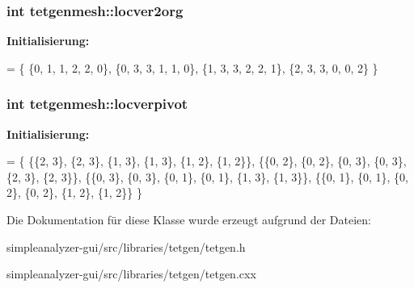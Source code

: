 \hypertarget{classtetgenmesh_a499b15cecc1ec34f5344c76374e76039}{
\subsubsection[{locver2org}]{\setlength{\rightskip}{0pt plus 5cm}int tetgenmesh\-::locver2org\hspace{0.3cm}{\ttfamily [static]}}}\label{classtetgenmesh_a499b15cecc1ec34f5344c76374e76039}
{\bfseries Initialisierung\-:}
\begin{DoxyCode}
= \{
  \{0, 1, 1, 2, 2, 0\},
  \{0, 3, 3, 1, 1, 0\},
  \{1, 3, 3, 2, 2, 1\},
  \{2, 3, 3, 0, 0, 2\} 
\}
\end{DoxyCode}
\hypertarget{classtetgenmesh_a98727eeffe416b960d345e6e2ac29482}{
\subsubsection[{locverpivot}]{\setlength{\rightskip}{0pt plus 5cm}int tetgenmesh\-::locverpivot\hspace{0.3cm}{\ttfamily [static]}}}\label{classtetgenmesh_a98727eeffe416b960d345e6e2ac29482}
{\bfseries Initialisierung\-:}
\begin{DoxyCode}
= \{
  \{\{2, 3\}, \{2, 3\}, \{1, 3\}, \{1, 3\}, \{1, 2\}, \{1, 2\}\},
  \{\{0, 2\}, \{0, 2\}, \{0, 3\}, \{0, 3\}, \{2, 3\}, \{2, 3\}\},
  \{\{0, 3\}, \{0, 3\}, \{0, 1\}, \{0, 1\}, \{1, 3\}, \{1, 3\}\},
  \{\{0, 1\}, \{0, 1\}, \{0, 2\}, \{0, 2\}, \{1, 2\}, \{1, 2\}\}
\}
\end{DoxyCode}


Die Dokumentation für diese Klasse wurde erzeugt aufgrund der Dateien\-:\begin{DoxyCompactItemize}
\item 
simpleanalyzer-\/gui/src/libraries/tetgen/tetgen.\-h\item 
simpleanalyzer-\/gui/src/libraries/tetgen/tetgen.\-cxx\end{DoxyCompactItemize}
